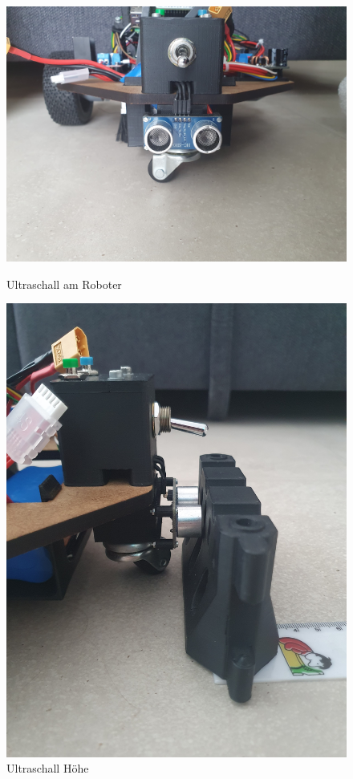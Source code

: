 \begin{figure}[H]
\centering
\begin{minipage}[b]{0.45\textwidth}
  \centering
  \includegraphics[width=\textwidth]{assets/ET/ultraschall/ultraschall.jpg}
  \caption{Ultraschall am Roboter}
  \label{fig:ultraschall-robi}
\end{minipage}
\hspace{0.05\textwidth} %
\begin{minipage}[b]{0.45\textwidth}
  \centering
  \includegraphics[width=\textwidth, angle=-90]{assets/ET/ultraschall/ultraschall-side.jpg}
  \caption{Ultraschall Höhe}
  \label{fig:ultraschall-hoehe}
\end{minipage}
\end{figure}

